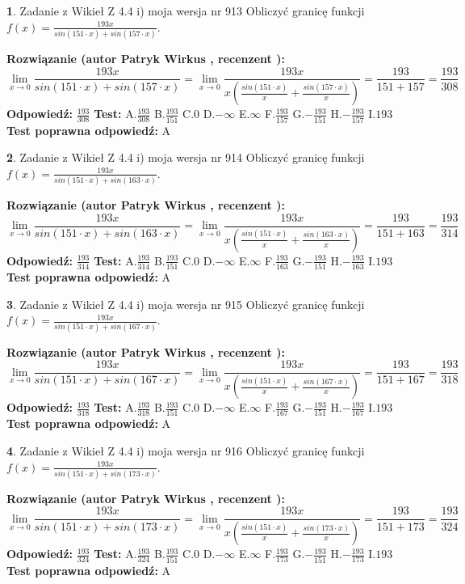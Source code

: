 \documentclass[12pt, a4paper]{article}
\theoremstyle{definition} %
\newtheorem{zad}{}
\newcommand{\zadStart}[1]{\begin{zad}#1\newline}
\newcommand{\zadStop}{\end{zad}}
\newcommand{\rozwStart}[2]{\noindent \textbf{Rozwiązanie (autor #1 , recenzent #2): }\newline}
\newcommand{\rozwStop}{\newline}
\newcommand{\odpStart}{\noindent \textbf{Odpowiedź:}\newline}
\newcommand{\odpStop}{\newline}
\newcommand{\testStart}{\noindent \textbf{Test:}\newline}
\newcommand{\testStop}{\newline}
\newcommand{\kluczStart}{\noindent \textbf{Test poprawna odpowiedź:}\newline}
\newcommand{\kluczStop}{\newline}
\begin{document}
\zadStart{Zadanie z Wikieł Z 4.4 i) moja wersja nr 913}
Obliczyć granicę funkcji $f(x)=\frac{193x}{sin(151\cdot x) +sin(157\cdot x)}$.
\zadStop
\rozwStart{Patryk Wirkus}{}
$$\lim\limits_{x\to 0}\frac{193x}{sin(151\cdot x) +sin(157\cdot x)}=\lim\limits_{x\to 0}\frac{193x}{x(\frac{sin(151\cdot x)}{x}+\frac{sin(157\cdot x)}{x})}=\frac{193}{151+157} = \frac{193}{308}$$
\rozwStop
\odpStart
$\frac{193}{308}$
\odpStop
\testStart
A.$\frac{193}{308}$
B.$\frac{193}{151}$
C.$0$
D.$-\infty$
E.$\infty$
F.$\frac{193}{157}$
G.$-\frac{193}{151}$
H.$-\frac{193}{157}$
I.$193$
\testStop
\kluczStart
A
\kluczStop



\zadStart{Zadanie z Wikieł Z 4.4 i) moja wersja nr 914}
Obliczyć granicę funkcji $f(x)=\frac{193x}{sin(151\cdot x) +sin(163\cdot x)}$.
\zadStop
\rozwStart{Patryk Wirkus}{}
$$\lim\limits_{x\to 0}\frac{193x}{sin(151\cdot x) +sin(163\cdot x)}=\lim\limits_{x\to 0}\frac{193x}{x(\frac{sin(151\cdot x)}{x}+\frac{sin(163\cdot x)}{x})}=\frac{193}{151+163} = \frac{193}{314}$$
\rozwStop
\odpStart
$\frac{193}{314}$
\odpStop
\testStart
A.$\frac{193}{314}$
B.$\frac{193}{151}$
C.$0$
D.$-\infty$
E.$\infty$
F.$\frac{193}{163}$
G.$-\frac{193}{151}$
H.$-\frac{193}{163}$
I.$193$
\testStop
\kluczStart
A
\kluczStop



\zadStart{Zadanie z Wikieł Z 4.4 i) moja wersja nr 915}
Obliczyć granicę funkcji $f(x)=\frac{193x}{sin(151\cdot x) +sin(167\cdot x)}$.
\zadStop
\rozwStart{Patryk Wirkus}{}
$$\lim\limits_{x\to 0}\frac{193x}{sin(151\cdot x) +sin(167\cdot x)}=\lim\limits_{x\to 0}\frac{193x}{x(\frac{sin(151\cdot x)}{x}+\frac{sin(167\cdot x)}{x})}=\frac{193}{151+167} = \frac{193}{318}$$
\rozwStop
\odpStart
$\frac{193}{318}$
\odpStop
\testStart
A.$\frac{193}{318}$
B.$\frac{193}{151}$
C.$0$
D.$-\infty$
E.$\infty$
F.$\frac{193}{167}$
G.$-\frac{193}{151}$
H.$-\frac{193}{167}$
I.$193$
\testStop
\kluczStart
A
\kluczStop



\zadStart{Zadanie z Wikieł Z 4.4 i) moja wersja nr 916}
Obliczyć granicę funkcji $f(x)=\frac{193x}{sin(151\cdot x) +sin(173\cdot x)}$.
\zadStop
\rozwStart{Patryk Wirkus}{}
$$\lim\limits_{x\to 0}\frac{193x}{sin(151\cdot x) +sin(173\cdot x)}=\lim\limits_{x\to 0}\frac{193x}{x(\frac{sin(151\cdot x)}{x}+\frac{sin(173\cdot x)}{x})}=\frac{193}{151+173} = \frac{193}{324}$$
\rozwStop
\odpStart
$\frac{193}{324}$
\odpStop
\testStart
A.$\frac{193}{324}$
B.$\frac{193}{151}$
C.$0$
D.$-\infty$
E.$\infty$
F.$\frac{193}{173}$
G.$-\frac{193}{151}$
H.$-\frac{193}{173}$
I.$193$
\testStop
\kluczStart
A
\kluczStop
\end{document}
